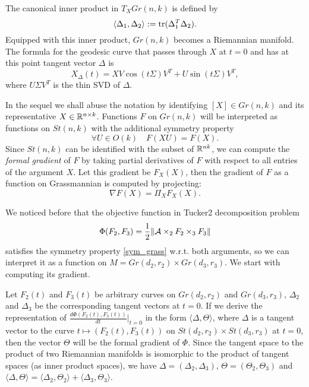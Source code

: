 The canonical inner product in $T_X Gr(n, k)$ is defined by
\begin{equation}
    \langle \Delta_1, \Delta_2 \rangle := \operatorname*{tr}( \Delta_1^T \Delta_2).
\end{equation}
Equipped with this inner product, $Gr(n, k)$ becomes a Riemannian
manifold. The formula
for the geodesic curve that passes through $X$ at $t = 0$ and has at this point tangent 
vector $\Delta$ is 
\begin{equation}
    \label{geodesic_grassm}
    X_{\Delta}(t) = XV \cos (t \Sigma) V^T + U \sin(t \Sigma) V^T,
\end{equation}
where $U \Sigma V^T$ is the thin SVD of $\Delta$.


In the sequel we shall abuse the notation by identifying $[X] \in Gr(n, k)$
and its representative $X \in \mathbb{R}^{n \times k}$. Functions $F$
on $Gr(n, k)$ will be interpreted as functions on $St(n, k)$ with the additional
symmetry property
\begin{equation}
    \label{sym_grass}
    \forall U \in O(k) \quad F(XU) = F(X).
\end{equation}
Since $St(n,k)$ can be identified with the subset of $\mathbb{R}^{nk}$, we can compute
the \textit{formal gradient} of $F$ by taking partial derivatives of $F$
with respect to all entries of the argument $X$. Let this gradient
be $F_X(X)$, then the gradient of $F$ as a function on Grassmannian
is computed by projecting:
\begin{equation}
\nabla F (X) = \Pi_{X} F_X(X).
\end{equation}

We noticed before that the objective function in Tucker2 decomposition 
problem
\begin{equation}
\Phi(F_2,F_3) = \frac{1}{2} \| \mathcal{A} \times _{2} F_2 \times _{3} F_3 \| 
\end{equation}
satisfies the symmetry property \eqref{sym_grass} w.r.t. both arguments,
so we can interpret it as a function on $M = Gr(d_2, r_2) \times Gr(d_3, r_3)$.
We start with computing its gradient. 


Let ${F_2}(t)$ and ${F_3}(t)$ be arbitrary curves on $Gr(d_2, r_2)$
and $Gr(d_3, r_3)$, $\Delta_2$ and $\Delta_3$ be the corresponding tangent
vectors at $t = 0$.
If we derive the representation of $\frac{d \Phi(F_2(t), F_3(t))}{dt} \rvert_{t = 0}$ in the form
$\langle \Delta, \Theta \rangle$, where $\Delta$ is a tangent vector
to the curve $t \mapsto (F_2(t), F_3(t))$ on $St(d_2, r_2) \times St(d_3, r_3)$ 
at $t = 0$, then the vector $\Theta$ will be the formal gradient of $\Phi$.
Since the tangent space to the product of two Riemannian manifolds is
isomorphic to the product of tangent spaces (as inner product spaces), we
have $\Delta = (\Delta_2, \Delta_3)$, $\Theta = (\Theta_2, \Theta_3)$
and $\langle \Delta, \Theta \rangle = \langle \Delta_2, \Theta_2 \rangle + 
\langle \Delta_3, \Theta_3 \rangle $.


